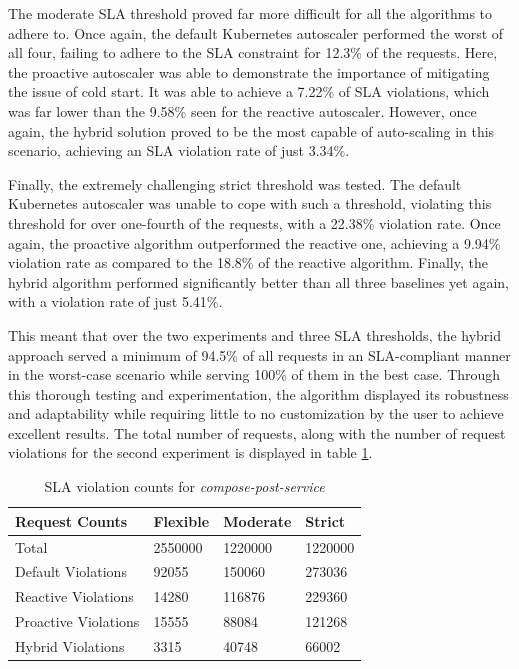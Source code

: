 The moderate SLA threshold proved far more difficult for all the algorithms to adhere to. Once again, the default Kubernetes autoscaler performed the worst of all four, failing to adhere to the SLA constraint for 12.3\% of the requests. Here, the proactive autoscaler was able to demonstrate the importance of mitigating the issue of cold start. It was able to achieve a 7.22\% of SLA violations, which was far lower than the 9.58\% seen for the reactive autoscaler. However, once again, the hybrid solution proved to be the most capable of auto-scaling in this scenario, achieving an SLA violation rate of just 3.34\%.

Finally, the extremely challenging strict threshold was tested. The default Kubernetes autoscaler was unable to cope with such a threshold, violating this threshold for over one-fourth of the requests, with a 22.38\% violation rate. Once again, the proactive algorithm outperformed the reactive one, achieving a 9.94\% violation rate as compared to the 18.8\% of the reactive algorithm. Finally, the hybrid algorithm performed significantly better than all three baselines yet again, with a violation rate of just 5.41\%.\par

This meant that over the two experiments and three SLA thresholds, the hybrid approach served a minimum of 94.5\% of all requests in an SLA-compliant manner in the worst-case scenario while serving 100\% of them in the best case. Through this thorough testing and experimentation, the algorithm displayed its robustness and adaptability while requiring little to no customization by the user to achieve excellent results. The total number of requests, along with the number of request violations for the second experiment is displayed in table \ref{tab:exp2-sla-violation-count}.\par

\begin{table}
    \caption{SLA violation counts for \textit{compose-post-service}}\label{tab:exp2-sla-violation-count}
    \centering
    \begin{tabular}{|l|l|l|l|}
        \hline
        Request Counts & Flexible & Moderate & Strict \\
        \hline
        Total  & \num[group-separator={,}]{2550000} & \num[group-separator={,}]{1220000} & \num[group-separator={,}]{1220000} \\
        \hline
        Default Violations & \num[group-separator={,}]{92055} & \num[group-separator={,}]{150060} & \num[group-separator={,}]{273036} \\
        Reactive Violations & \num[group-separator={,}]{14280} & \num[group-separator={,}]{116876} & \num[group-separator={,}]{229360} \\
        Proactive Violations & \num[group-separator={,}]{15555} & \num[group-separator={,}]{88084} & \num[group-separator={,}]{121268} \\
        Hybrid Violations & \num[group-separator={,}]{3315} & \num[group-separator={,}]{40748} & \num[group-separator={,}]{66002} \\
         \hline
    \end{tabular}
\end{table}

